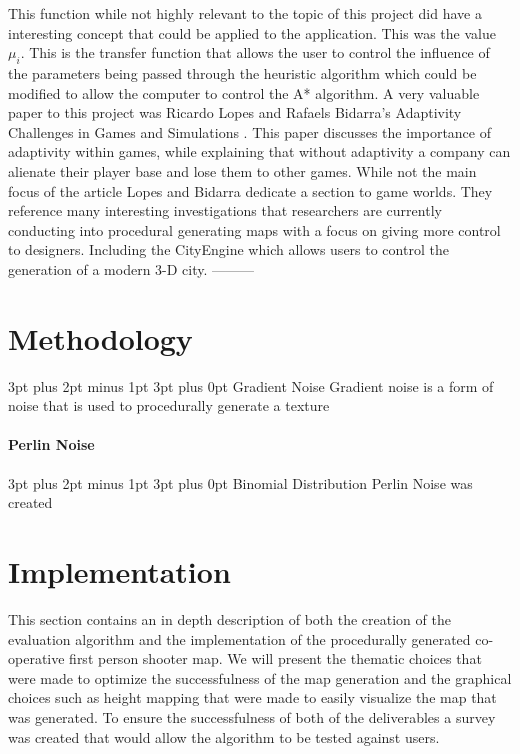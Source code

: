 \documentclass[12pt,a4paper,oneside]{book}
\makeatletter
\renewcommand\subsection{\@startsection {subsection}{1}{2mm} %
                               {3pt plus 2pt minus 1pt} %
                               {3pt plus 0pt} %
                               {\normalfont\bfseries}}
\makeatother
\begin{document}
This function while not highly relevant to the topic of this project did have a interesting concept that could be applied to the application. This was the value \(\mu_i\). This is the transfer function that allows the user to control the influence of the parameters being passed through the heuristic algorithm which could be modified to allow the computer to control the A* algorithm. 
\vspace{5mm} 
\newline
A very valuable paper to this project was Ricardo Lopes and Rafaels Bidarra's Adaptivity Challenges in Games and Simulations \cite{Fun}. This paper discusses the importance of adaptivity within games, while explaining that without adaptivity a company can alienate their player base and lose them to other games. While not the main focus of the article Lopes and Bidarra dedicate a section to game worlds. They reference many interesting investigations that researchers are currently conducting into procedural generating maps with a focus on giving more control to designers. Including the CityEngine which allows users to control the generation of a modern 3-D city.   ---------
\chapter{Methodology}
\subsection{Gradient Noise}
Gradient noise is a form of noise that is used to procedurally generate a texture 
\subsubsection{Perlin Noise}
\subsection{Binomial Distribution }
Perlin Noise was created 
\chapter{Implementation}
This section contains an in depth description of both the creation of the evaluation algorithm and the implementation of the procedurally generated co-operative first person shooter map. We will present the thematic choices that were made to optimize the successfulness of the map generation and the graphical choices such as height mapping that were made to easily visualize the map that was generated. To ensure the successfulness of both of the deliverables a survey was created that would allow the algorithm to be tested against users.
\vspace{5mm} 
\end{document}
